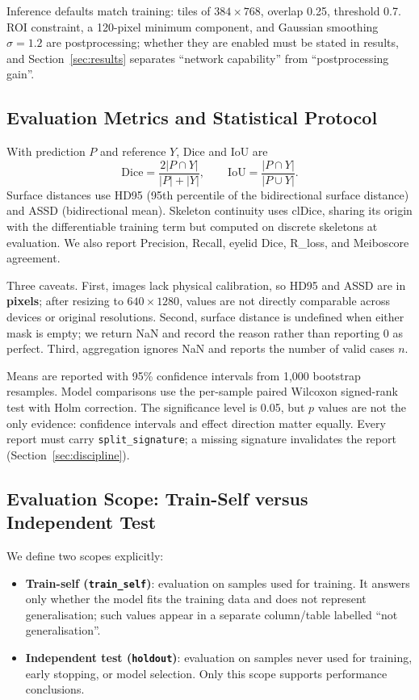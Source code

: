 Inference defaults match training: tiles of $384\times768$, overlap 0.25, threshold 0.7. ROI constraint, a 120-pixel minimum component, and Gaussian smoothing $\sigma=1.2$ are postprocessing; whether they are enabled must be stated in results, and Section~\ref{sec:results} separates ``network capability'' from ``postprocessing gain''.

\subsection{Evaluation Metrics and Statistical Protocol}\label{sec:metrics}

With prediction $P$ and reference $Y$, Dice and IoU are
\begin{equation}
\mathrm{Dice}=\frac{2|P\cap Y|}{|P|+|Y|},\qquad
\mathrm{IoU}=\frac{|P\cap Y|}{|P\cup Y|}.
\end{equation}
Surface distances use HD95 (95th percentile of the bidirectional surface distance) and ASSD (bidirectional mean). Skeleton continuity uses clDice, sharing its origin with the differentiable training term but computed on discrete skeletons at evaluation. We also report Precision, Recall, eyelid Dice, R\_loss, and Meiboscore agreement.

Three caveats. First, images lack physical calibration, so HD95 and ASSD are in \textbf{pixels}; after resizing to $640\times1280$, values are not directly comparable across devices or original resolutions. Second, surface distance is undefined when either mask is empty; we return NaN and record the reason rather than reporting 0 as perfect. Third, aggregation ignores NaN and reports the number of valid cases $n$.

Means are reported with 95\% confidence intervals from 1{,}000 bootstrap resamples. Model comparisons use the per-sample paired Wilcoxon signed-rank test with Holm correction. The significance level is 0.05, but $p$ values are not the only evidence: confidence intervals and effect direction matter equally. Every report must carry \texttt{split\_signature}; a missing signature invalidates the report (Section~\ref{sec:discipline}).

\subsection{Evaluation Scope: Train-Self versus Independent Test}\label{sec:scope}

We define two scopes explicitly:
\begin{itemize}
\item \textbf{Train-self (\texttt{train\_self})}: evaluation on samples used for training. It answers only whether the model fits the training data and does not represent generalisation; such values appear in a separate column/table labelled ``not generalisation''.
\item \textbf{Independent test (\texttt{holdout})}: evaluation on samples never used for training, early stopping, or model selection. Only this scope supports performance conclusions.
\end{itemize}

